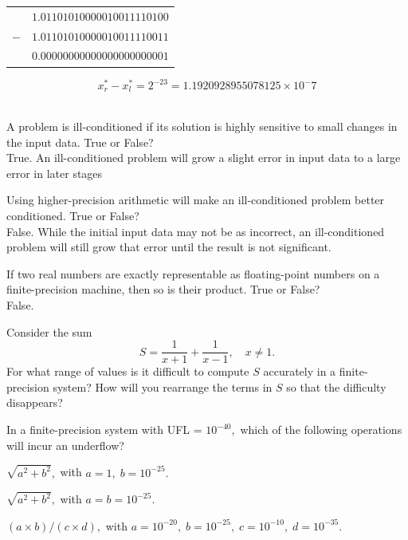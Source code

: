 	\begin{center}
	\begin{tabular}{cc}
		&$1.01101010000010011110100$ \\
		$-$ & $1.01101010000010011110011$ \\
		\hline
		&$0.00000000000000000000001$ \\
	\end{tabular}
	\end{center}

	$$x^*_r - x^*_l = 2^{-23} = 1.1920928955078125×10^-7$$ \\

\eenum

\item
\benum
\item A problem is ill-conditioned if its solution is highly sensitive to small changes in the input data.  True or False? \\
	True. An ill-conditioned problem will grow a slight error in input data to a large error in later stages \\

\item Using higher-precision arithmetic will make an ill-conditioned problem better conditioned.  True or False? \\
	False. While the initial input data may not be as incorrect, an ill-conditioned problem will still grow that error until the result
	is not significant. \\

\item  If two real numbers are exactly representable as floating-point numbers on a finite-precision machine, then so is their product.  True or False? \\
	False.
\item  Consider the sum
\[
S = \frac{1}{x+1} + \frac{1}{x-1}, \quad x \ne 1.
\]
For what range of values is it difficult to compute $S$ accurately in a finite-precision system?  How will you rearrange the terms in $S$ so that the difficulty disappears?
\item In a finite-precision system with UFL = $10^{-40},$ which of the following operations will incur an underflow?
\benum
\item $\sqrt{a^2+b^2},$ with $a=1, \; b=10^{-25}.$
\item $\sqrt{a^2+b^2},$ with $a=b=10^{-25}.$
\item $(a\times b)/(c \times d),$ with $a=10^{-20}, \; b=10^{-25}, \; c=10^{-10}, \; d=10^{-35}.$
\eenum

\eenum

\eenum

